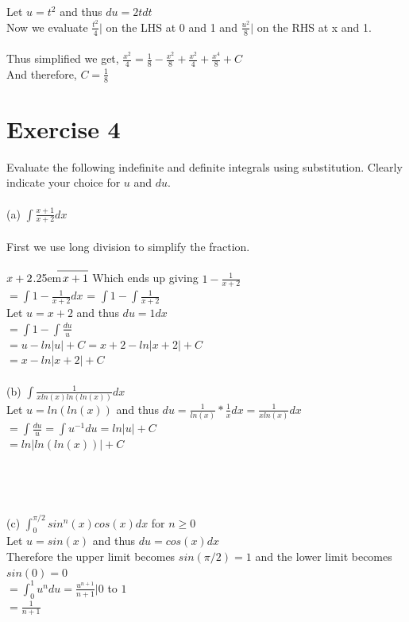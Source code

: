 \documentclass[12pt]{article}
\newcommand\Mydiv[2]{%
$\strut#1$\kern.25em\smash{\raise.3ex\hbox{$\big)$}}$\mkern-8mu
        \overline{\enspace\strut#2}$}
\begin{document}
\noindent Let $u = t^2$ and thus $du = 2tdt$\\
Now we evaluate $\frac{t^2}{4}\bigg|$ on the LHS at 0 and 1 and $\frac{u^2}{8}\bigg|$ on the RHS at x and 1.\\~\\

\noindent Thus simplified we get, $\frac{x^2}{4} = \frac{1}{8}-\frac{x^2}{8} + \frac{x^2}{4}+\frac{x^4}{8}+C$\\
And therefore, $C = \frac{1}{8}$

\section{Exercise 4}
Evaluate the following indefinite and definite integrals using substitution. Clearly indicate your choice for $u$ and $du$. \\~\\
(a) $\int\frac{x+1}{x+2}dx$\\~\\
First we use long division to simplify the fraction. \\~\\
\Mydiv{x+2}{x+1} Which ends up giving $1 - \frac{1}{x+2}$\\
$= \int 1-\frac{1}{x+2}dx$ = $\int 1 - \int \frac{1}{x+2}$\\
Let $u = x+2$ and thus $du = 1dx$\\
$= \int 1 - \int \frac{du}{u}$\\
$= u - ln|u| + C = x + 2 - ln|x+2| + C$\\
$= x - ln|x+2| + C$\\~\\

\noindent(b) $\int \frac{1}{xln(x)ln(ln(x))}dx$\\
Let $u = ln(ln(x))$ and thus $du = \frac{1}{ln(x)} * \frac{1}{x} dx = \frac{1}{xln(x)} dx$\\
$= \int \frac{du}{u} = \int u^{-1} du = ln|u| + C$\\
$= ln|ln(ln(x))|+C$ \\~\\~\\~\\~\\

\noindent(c) $\int_{0}^{\pi/2} sin^n(x)cos(x)dx$ for $n \geq 0$\\
Let $u = sin(x)$ and thus $du = cos(x)dx$\\
Therefore the upper limit becomes $sin(\pi/2) = 1$ and the lower limit becomes $sin(0) = 0$\\
$= \int_0^{1} u^n du = \frac{u^{n+1}}{n+1} \bigg| 0$ to $1$\\
$=\frac{1}{n+1}$
\end{document}
